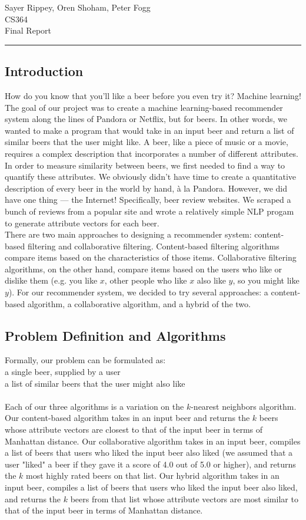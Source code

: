\documentclass[11pt]{article}
\renewcommand{\maketitle}{
  \begin{center}
    \begin{flushright}
      Sayer Rippey, Oren Shoham, Peter Fogg \\
      CS364 \\
      Final Report
    \end{flushright}
    \rule{\linewidth}{0.1mm}
  \end{center}
}
\begin{document}
\maketitle
\subsection*{Introduction}
How do you know that you'll like a beer before you even try it? Machine learning! The goal of our project was to create a machine learning-based recommender system along the lines of Pandora or Netflix, but for beers. In other words, we wanted to make a program that would take in an input beer and return a list of similar beers that the user might like. A beer, like a piece of music or a movie, requires a complex description that incorporates a number of different attributes. In order to measure similarity between beers, we first needed to find a way to quantify these attributes. We obviously didn't have time to create a quantitative description of every beer in the world by hand, \`{a} la Pandora. However, we did have one thing --- the Internet! Specifically, beer review websites. We scraped a bunch of reviews from a popular site and wrote a relatively simple NLP progam to generate attribute vectors for each beer.  \\
\indent There are two main approaches to designing a recommender system: content-based filtering and collaborative filtering. Content-based filtering algorithms compare items based on the characteristics of those items. Collaborative filtering algorithms, on the other hand, compare items based on the users who like or dislike them (e.g. you like $x$, other people who like $x$ also like $y$, so you might like $y$). For our recommender system, we decided to try several approaches: a content-based algorithm, a collaborative algorithm, and a hybrid of the two.

\subsection*{Problem Definition and Algorithms}
Formally, our problem can be formulated as: \\
 a single beer, supplied by a user \\
 a list of similar beers that the user might also like \\
\\
Each of our three algorithms is a variation on the $k$-nearest neighbors algorithm. Our content-based algorithm takes in an input beer and returns the $k$ beers whose attribute vectors are closest to that of the input beer in terms of Manhattan distance. Our collaborative algorithm takes in an input beer, compiles a list of beers that users who liked the input beer also liked (we assumed that a user "liked"  a beer if they gave it a score of 4.0 out of 5.0 or higher), and returns the $k$ most highly rated beers on that list. Our hybrid algorithm takes in an input beer, compiles a list of beers that users who liked the input beer also liked, and returns the $k$ beers from that list whose attribute vectors are most similar to that of the input beer in terms of Manhattan distance.
\end{document}
